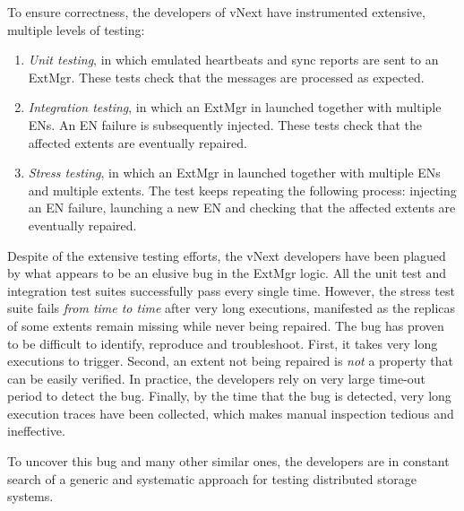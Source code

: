 To ensure correctness, the developers of vNext have instrumented extensive, multiple levels of testing:
\begin{enumerate}
\item \emph{Unit testing}, in which emulated heartbeats and sync reports are sent to an ExtMgr. These tests check that the messages are processed as expected.

\item \emph{Integration testing}, in which an ExtMgr in launched together with multiple ENs. An EN failure is subsequently injected. These tests check that the affected extents are eventually repaired.

\item \emph{Stress testing}, in which an ExtMgr in launched together with multiple ENs and multiple extents. The test keeps repeating the following process: injecting an EN failure, launching a new EN and checking that the affected extents are eventually repaired.
\end{enumerate}

Despite of the extensive testing efforts, the vNext developers have been plagued by what appears to be an elusive bug in the ExtMgr logic. All the unit test and integration test suites successfully pass every single time. However, the stress test suite fails {\em from time to time} after very long executions, manifested as the replicas of some extents remain missing while never being repaired. The bug has proven to be difficult to identify, reproduce and troubleshoot. First, it takes very long executions to trigger. Second, an extent not being repaired is {\em not} a property that can be easily verified. In practice, the developers rely on very large time-out period to detect the bug. Finally, by the time that the bug is detected, very long execution traces have been collected, which makes manual inspection tedious and ineffective.

To uncover this bug and many other similar ones, the developers are in constant search of a generic and systematic approach for testing distributed storage systems.

